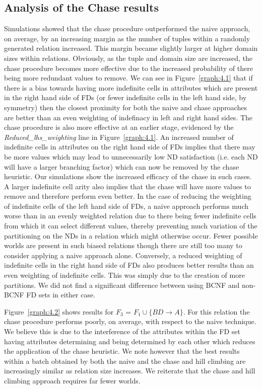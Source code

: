 \subsection{Analysis of the Chase results}
Simulations showed that the chase 
procedure outperformed
the naive approach, on average, by an increasing margin as the number of
tuples within a randomly generated relation increased. This margin became
slightly larger at higher domain sizes within relations. Obviously, as the
tuple and domain size are increased, the chase procedure becomes more 
effective due to the increased probability of there being more redundant 
values to remove. We can see in Figure~\ref{graph:4.1}
that if there is a bias towards having more indefinite cells in attributes
which are present in the right hand side of FDs (or fewer indefinite
cells in the left hand side, by symmetry) then
the closest proximity for both the naive and chase approaches are better
than an even weighting of indefinacy in left and right hand sides. The
chase procedure is also more effective 
at an earlier stage, evidenced by the {\em Reduced\_lhs\_weighting}
line in Figure~\ref{graph:4.1}. An increased number of indefinite
cells in attributes 
on the right hand side of FDs implies that there may be more values which
may lead to unnecessarily low ND satisfaction (i.e. each ND will have a 
larger branching factor) which can now be removed by the chase heuristic.
Our simulations show the increased efficacy of the chase in such cases.
A larger indefinite cell arity also implies that the chase will have more
values to remove and therefore perform even better. In the case of reducing
the weighting of indefinite cells of the left hand side of FDs, a naive
approach performs much worse than in an evenly weighted relation due to
there being fewer indefinite cells from which it can select different
values, thereby preventing much variation of the partitioning on the NDs 
in a relation which might otherwise occur. Fewer possible worlds are
present in such biased relations though there are still too many to
consider applying a naive approach alone.
Conversely, a reduced
weighting of indefinite cells in the right hand side of FDs also
produces better results than an even weighting of indefinite
cells. This was simply due to the creation of more partitions.
We did not find a
significant difference between using BCNF and non-BCNF FD sets in
either case.

Figure~\ref{graph:4.2} shows results for
$F_3$ = $F_1 \cup \{ BD \to A \}$. For this relation
the chase procedure performs poorly, on average, with respect to the
naive technique. We believe this is due to the interference of the attributes
within the FD set having attributes determining and being determined by
each other which reduces the application of the chase heuristic.
 We note however that the best results within a batch obtained by both
the naive and the chase and hill climbing are increasingly similar as
relation size increases. We reiterate that the chase and hill climbing
approach requires far fewer worlds.

